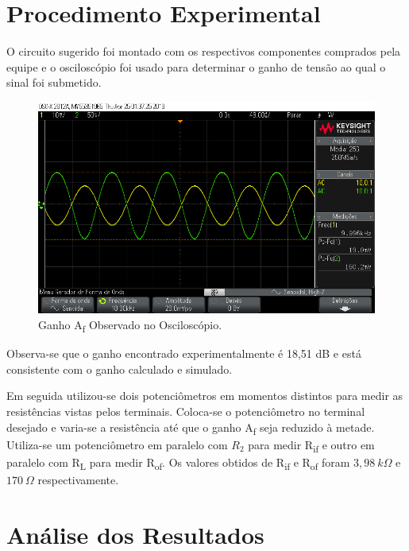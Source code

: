 \documentclass[journal, a4paper]{IEEEtran}
\begin{document}
        
\section{Procedimento Experimental}

    \tab O circuito sugerido foi montado com os respectivos componentes comprados pela equipe e o osciloscópio foi usado para determinar o ganho de tensão ao qual o sinal foi submetido.
    
    
        
        \begin{figure}[H]
    		\begin{center}
    		\includegraphics[width=\columnwidth]{ganhoAf-pratica.png}
    		\caption{Ganho A\textsubscript{f} Observado no Osciloscópio.}
    		\label{ganho af pratica}
    		\end{center}
    	\end{figure}
    	
    \tab Observa-se que o ganho encontrado experimentalmente é 18,51 dB e está consistente com o ganho calculado e simulado.
        
    \tab Em seguida utilizou-se dois potenciômetros em momentos distintos para medir as resistências vistas pelos terminais. Coloca-se o potenciômetro no terminal desejado e varia-se a resistência até que o ganho A\textsubscript{f} seja reduzido à metade. Utiliza-se um potenciômetro em paralelo com $R_2$ para medir R\textsubscript{if} e outro em paralelo com R\textsubscript{L} para medir R\textsubscript{of}. Os valores obtidos de R\textsubscript{if} e R\textsubscript{of} foram $3,98 \: k\Omega$ e $170 \: \Omega$ respectivamente.
    
    
\section{Análise dos Resultados}
\end{document}
